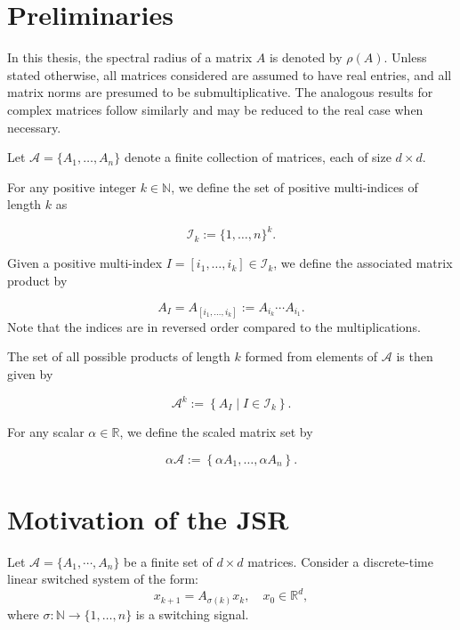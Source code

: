 \section{Preliminaries}

In this thesis, the spectral radius of a matrix $A$ is denoted by $\rho(A)$. Unless stated otherwise, all matrices considered are assumed to have real entries, and all matrix norms are presumed to be submultiplicative. The analogous results for complex matrices follow similarly and may be reduced to the real case when necessary.

Let $\mathcal{A} = \{A_1, \dots, A_n\}$ denote a finite collection of matrices, each of size $d \times d$.

For any positive integer $k \in \mathbb{N}$, we define the set of positive multi-indices of length $k$ as

$$
    \mathcal{I}_k := \{1, \dots, n\}^k.
$$

Given a positive multi-index $I = [i_1, \dots, i_k] \in \mathcal{I}_k$, we define the associated matrix product by

$$
    A_I = A_{[i_1, \dots, i_k]} := A_{i_k} \cdots A_{i_1}.
$$
Note that the indices are in reversed order compared to the multiplications.

The set of all possible products of length $k$ formed from elements of $\mathcal{A}$ is then given by

$$
    \mathcal{A}^k := \left\{ A_I \mid I \in \mathcal{I}_k \right\}.
$$

For any scalar $\alpha \in \mathbb{R}$, we define the scaled matrix set by

$$
    \alpha \mathcal{A} := \left\{ \alpha A_1, \dots, \alpha A_n \right\}.
$$

\section{Motivation of the JSR}

Let $\mathcal{A} = \{A_1, \cdots, A_n\}$ be a finite set of $d\times d$ matrices. 
Consider a discrete-time linear switched system of the form:
\begin{equation} \label{eq:switched_system}
x_{k+1} = A_{\sigma(k)} x_k, \quad x_0 \in \mathbb{R}^d,
\end{equation}
where $\sigma: \mathbb{N} \to \{1, \dots, n\}$ is a switching signal.


